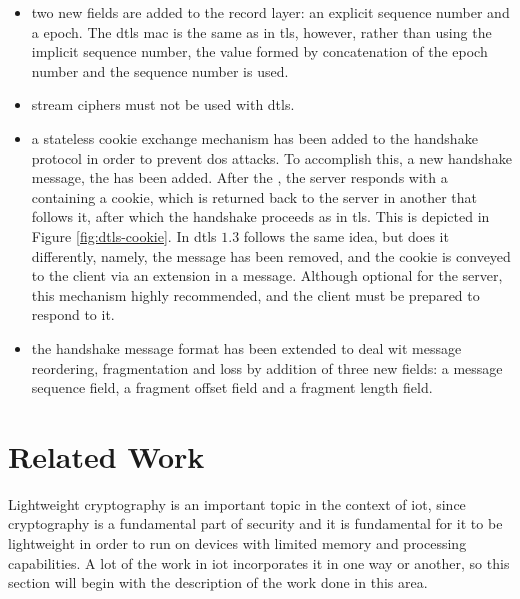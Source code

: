 \documentclass{llncs}
\begin{document}
\begin{itemize}
  \item two new fields are added to the record layer: an explicit  sequence
  number and a  epoch. The \gls{dtls} \gls{mac} is the same as in \gls{tls},
  however, rather than using the implicit sequence number, the  value
  formed by concatenation of the epoch number and the sequence number is used.

  \item stream ciphers must not be used with \gls{dtls}.

  \item a stateless cookie exchange mechanism has been added to the handshake protocol
  in order to prevent \gls{dos} attacks. To accomplish this, a new handshake
  message, the  has been added. After
  the , the server responds with a 
  containing a cookie, which is returned back to the server in another
   that follows it, after which the handshake proceeds as in \gls{tls}. This is depicted in Figure \ref{fig:dtls-cookie}. In \gls{dtls} $1.3$ follows the same idea, but does it differently, namely,
  the  message has been removed, and the cookie is conveyed to the client via an extension in a  message.
  Although optional for the server, this mechanism highly recommended, and the
  client must be prepared to respond to it.

  \item the handshake message format has been extended to deal wit message reordering,
  fragmentation and loss by addition of three new fields: a message sequence field,
  a fragment offset field and a fragment length field.
\end{itemize}

\section{Related Work}

Lightweight cryptography is an important topic in the context of \gls{iot}, since
cryptography is a fundamental part of security and it is fundamental for it to be
lightweight in order to run on devices with limited memory and processing
capabilities. A lot of the work in \gls{iot} incorporates it in one way or another,
so this section will begin with the description of the work done in this area.
\end{document}
